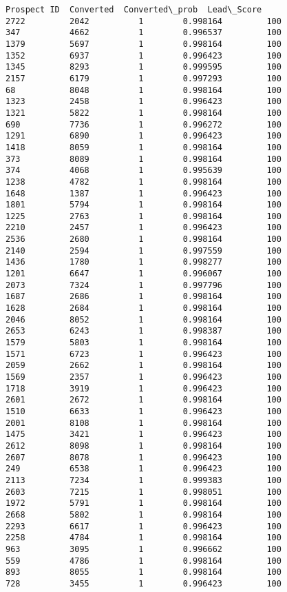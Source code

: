 \documentclass[11pt]{article}
\makeatletter
\newcommand{\boxspacing}{\kern\kvtcb@left@rule\kern\kvtcb@boxsep}
\newcommand{\prompt}[4]{
        \ttfamily\llap{{\color{#2}[#3]:\hspace{3pt}#4}}\vspace{-\baselineskip}
    }
\makeatother
\begin{document}
            \begin{tcolorbox}[breakable, size=fbox, boxrule=.5pt, pad at break*=1mm, opacityfill=0]
\prompt{Out}{outcolor}{121}{\boxspacing}
\begin{Verbatim}[commandchars=\\\{\}]
      Prospect ID  Converted  Converted\_prob  Lead\_Score
2722         2042          1        0.998164         100
347          4662          1        0.996537         100
1379         5697          1        0.998164         100
1352         6937          1        0.996423         100
1345         8293          1        0.999595         100
2157         6179          1        0.997293         100
68           8048          1        0.998164         100
1323         2458          1        0.996423         100
1321         5822          1        0.998164         100
690          7736          1        0.996272         100
1291         6890          1        0.996423         100
1418         8059          1        0.998164         100
373          8089          1        0.998164         100
374          4068          1        0.995639         100
1238         4782          1        0.998164         100
1648         1387          1        0.996423         100
1801         5794          1        0.998164         100
1225         2763          1        0.998164         100
2210         2457          1        0.996423         100
2536         2680          1        0.998164         100
2140         2594          1        0.997559         100
1436         1780          1        0.998277         100
1201         6647          1        0.996067         100
2073         7324          1        0.997796         100
1687         2686          1        0.998164         100
1628         2684          1        0.998164         100
2046         8052          1        0.998164         100
2653         6243          1        0.998387         100
1579         5803          1        0.998164         100
1571         6723          1        0.996423         100
2059         2662          1        0.998164         100
1569         2357          1        0.996423         100
1718         3919          1        0.996423         100
2601         2672          1        0.998164         100
1510         6633          1        0.996423         100
2001         8108          1        0.998164         100
1475         3421          1        0.996423         100
2612         8098          1        0.998164         100
2607         8078          1        0.996423         100
249          6538          1        0.996423         100
2113         7234          1        0.999383         100
2603         7215          1        0.998051         100
1972         5791          1        0.998164         100
2668         5802          1        0.998164         100
2293         6617          1        0.996423         100
2258         4784          1        0.998164         100
963          3095          1        0.996662         100
559          4786          1        0.998164         100
893          8055          1        0.998164         100
728          3455          1        0.996423         100
\end{Verbatim}
\end{tcolorbox}
        
\end{document}
